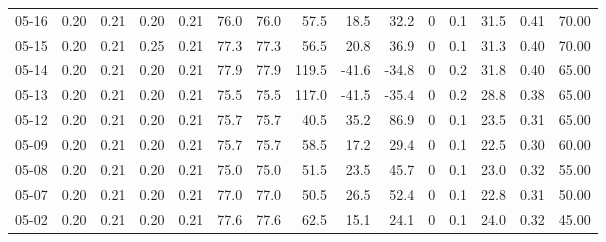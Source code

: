 \begin{threeparttable}
{\begin{tabular}{lrrrrrrrrrrrrrr}
  05-16 &          0.20 &          0.21 &          0.20 &        0.21 &                76.0 &               76.0 &                57.5 &       18.5 &         32.2 &              0 &                 0.1 &             31.5 &            0.41 &                  70.00 \\
  05-15 &          0.20 &          0.21 &          0.25 &        0.21 &                77.3 &               77.3 &                56.5 &       20.8 &         36.9 &              0 &                 0.1 &             31.3 &            0.40 &                  70.00 \\
  05-14 &          0.20 &          0.21 &          0.20 &        0.21 &                77.9 &               77.9 &               119.5 &      -41.6 &        -34.8 &              0 &                 0.2 &             31.8 &            0.40 &                  65.00 \\
  05-13 &          0.20 &          0.21 &          0.20 &        0.21 &                75.5 &               75.5 &               117.0 &      -41.5 &        -35.4 &              0 &                 0.2 &             28.8 &            0.38 &                  65.00 \\
  05-12 &          0.20 &          0.21 &          0.20 &        0.21 &                75.7 &               75.7 &                40.5 &       35.2 &         86.9 &              0 &                 0.1 &             23.5 &            0.31 &                  65.00 \\
  05-09 &          0.20 &          0.21 &          0.20 &        0.21 &                75.7 &               75.7 &                58.5 &       17.2 &         29.4 &              0 &                 0.1 &             22.5 &            0.30 &                  60.00 \\
  05-08 &          0.20 &          0.21 &          0.20 &        0.21 &                75.0 &               75.0 &                51.5 &       23.5 &         45.7 &              0 &                 0.1 &             23.0 &            0.32 &                  55.00 \\
  05-07 &          0.20 &          0.21 &          0.20 &        0.21 &                77.0 &               77.0 &                50.5 &       26.5 &         52.4 &              0 &                 0.1 &             22.8 &            0.31 &                  50.00 \\
  05-02 &          0.20 &          0.21 &          0.20 &        0.21 &                77.6 &               77.6 &                62.5 &       15.1 &         24.1 &              0 &                 0.1 &             24.0 &            0.32 &                  45.00 \\

\end{tabular}}
\end{threeparttable}
